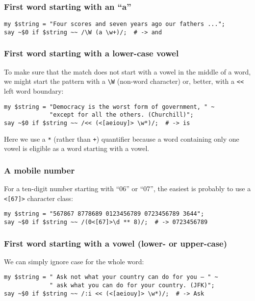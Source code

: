 \subsubsection{First word starting with an ``a''}

\begin{verbatim}
my $string = "Four scores and seven years ago our fathers ...";
say ~$0 if $string ~~ /\W (a \w+)/;  # -> and
\end{verbatim}

\subsubsection{First word starting with a lower-case vowel}

To make sure that the match does not start with a vowel in 
the middle of a word, we might start the pattern with a 
\verb'\W' (non-word character) or, better, with a \verb'<<' 
left word boundary:

\begin{verbatim}
my $string = "Democracy is the worst form of government, " ~
             "except for all the others. (Churchill)";
say ~$0 if $string ~~ /<< (<[aeiouy]> \w*)/;  # -> is
\end{verbatim}

Here we use a \verb'*' (rather than \verb'+') quantifier 
because a word containing only one vowel is eligible as 
a word starting with a vowel.

\subsubsection{A mobile number}

For a ten-digit number starting with ``06'' or ``07'', the 
easiest is probably to use a \verb'<[67]>' character 
class:

\begin{verbatim}
my $string = "567867 8778689 0123456789 0723456789 3644";
say ~$0 if $string ~~ /(0<[67]>\d ** 8)/;  # -> 0723456789
\end{verbatim}

\subsubsection{First word starting with a vowel (lower- or upper-case)}

We can simply ignore case for the whole word:
\begin{verbatim}
my $string = " Ask not what your country can do for you — " ~
             " ask what you can do for your country. (JFK)";
say ~$0 if $string ~~ /:i << (<[aeiouy]> \w*)/;  # -> Ask
\end{verbatim}

